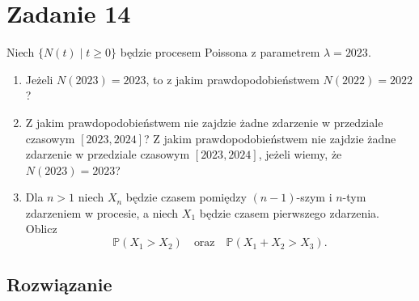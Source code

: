 \section{Zadanie 14}

Niech \(\{N(t)\mid t \ge 0\}\) będzie procesem Poissona z parametrem \(\lambda = 2023\).

\begin{enumerate}
	\item Jeżeli \(N(2023)=2023\), to z jakim prawdopodobieństwem \(N(2022)=2022\)?

	\item
	      Z jakim prawdopodobieństwem nie zajdzie żadne zdarzenie w przedziale czasowym
	      \([2023,2024]\)?
	      Z jakim prawdopodobieństwem nie zajdzie żadne zdarzenie w przedziale czasowym
	      \([2023,2024]\), jeżeli wiemy, że \(N(2023)=2023\)?

	\item Dla \(n>1\) niech \(X_n\) będzie czasem pomiędzy \((n-1)\)-szym i \(n\)-tym zdarzeniem
	      w procesie, a niech \(X_1\) będzie czasem pierwszego zdarzenia.
	      Oblicz
	      \[
		      \mathbb{P}(X_1 > X_2)
		      \quad \text{oraz} \quad
		      \mathbb{P}(X_1 + X_2 > X_3).
	      \]
\end{enumerate}

\subsection*{Rozwiązanie}

